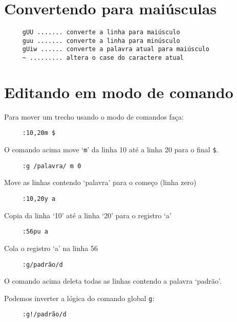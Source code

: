 \section{Convertendo para maiúsculas}
\label{sec:Convertendo para maiúsculas}

\begin{verbatim}
     gUU ....... converte a linha para maiúsculo
     guu ....... converte a linha para minúsculo
     gUiw ...... converte a palavra atual para maiúsculo
     ~ ......... altera o case do caractere atual
\end{verbatim}


\section{Editando em modo de comando}
\label{sec:Editando em modo de comando}

Para mover um trecho usando o modo de comandos faça:

\begin{verbatim}
     :10,20m $
\end{verbatim}

O comando acima move `{\tt m}' da linha 10 até a linha 20 para o final \verb|$|.

\begin{verbatim}
     :g /palavra/ m 0
\end{verbatim}

Move as linhas contendo `palavra' para o começo (linha zero)


\begin{verbatim}
     :10,20y a
\end{verbatim}

Copia da linha `10' até a linha `20' para o registro `a'

\begin{verbatim}
     :56pu a
\end{verbatim}

Cola o registro `a' na linha 56

\begin{verbatim}
     :g/padrão/d
\end{verbatim}

O comando acima deleta todas as linhas contendo a palavra `padrão'.

Podemos inverter a lógica do comando global \verb+g+:

\begin{verbatim}
     :g!/padrão/d
\end{verbatim}

